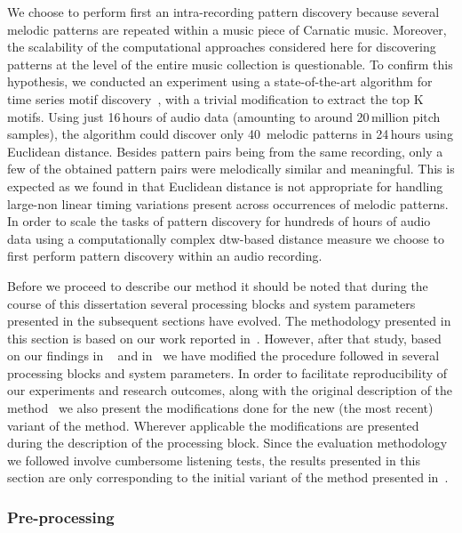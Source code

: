 We choose to perform first an intra-recording pattern discovery because several melodic patterns are repeated within a music piece of Carnatic music. Moreover, the scalability of the computational approaches considered here for discovering patterns at the level of the entire music collection is questionable. To confirm this hypothesis, we conducted an experiment using a state-of-the-art algorithm for time series motif discovery~\citep{Mueen2009}, with a trivial modification to extract the top K motifs. Using just 16\,hours of audio data (amounting to around 20\,million pitch samples), the algorithm could discover only 40~melodic patterns in 24\,hours using Euclidean distance. Besides pattern pairs being from the same recording, only a few of the obtained pattern pairs were melodically similar and meaningful. This is expected as we found in  that Euclidean distance is not appropriate for handling large-non linear timing variations present across occurrences of melodic patterns. In order to scale the tasks of pattern discovery for hundreds of hours of audio data using a computationally complex \gls{dtw}-based distance measure we choose to first perform pattern discovery within an audio recording.

Before we proceed to describe our method it should be noted that during the course of this dissertation several processing blocks and system parameters presented in the subsequent sections have evolved. The methodology presented in this section is based on our work reported in~\cite{gulati_SITIS_2014}. However, after that study, based on our findings in ~\cite{gulati_ICASSP2015} and in~\cite{gulati_ICASSP2015} we have modified the procedure followed in several processing blocks and system parameters. In order to facilitate reproducibility of our experiments and research outcomes, along with the original description of the method~\citep{gulati_SITIS_2014} we also present the modifications done for the new (the most recent) variant of the method. Wherever applicable the modifications are presented during the description of the processing block. Since the evaluation methodology we followed involve cumbersome listening tests, the results presented in this section are only corresponding to the initial variant of the method presented in~\cite{gulati_SITIS_2014}.


\subsubsection{Pre-processing}
\label{sec:pattern_discover_preprocessing}

